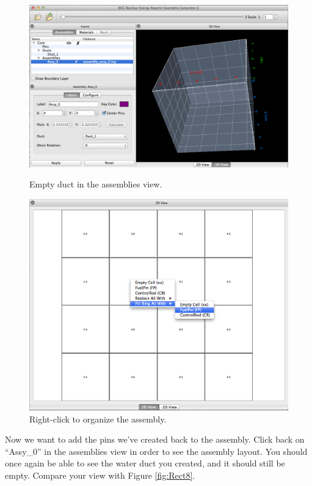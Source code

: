 \begin{figure}[H]
\centering
\begin{minipage}{.5\textwidth}
  \centering
  \includegraphics[width=0.90\linewidth]{Images/rect-empty-assy.png}
\caption{Empty duct in the assemblies view.}
\label{fig:Rect8}
\end{minipage}%
\hspace{0.5cm}
\begin{minipage}{.35\textwidth}
  \centering
 \includegraphics[width=0.9\linewidth]{Images/rect-assign-pin.png}
\caption{Right-click to organize the assembly.}
\label{fig:Rect9}
\end{minipage}
\end{figure}

Now we want to add the pins we've created back to the assembly.  Click back on ``Assy\_0'' in the assemblies view in order to see the assembly layout.  You should once again be able to see the water duct you created, and it should still be empty.  Compare your view with Figure \ref{fig:Rect8}.

